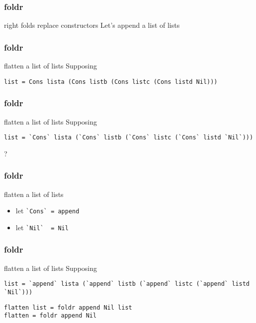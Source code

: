 %

\begin{frame}[fragile]
\frametitle{foldr}
\begin{block}{right folds replace constructors}
Let's append a list of lists
\end{block}
\end{frame}

\begin{frame}[fragile]
\frametitle{foldr}
\begin{block}{flatten a list of lists}
Supposing 
\begin{lstlisting}[style=haskell,basicstyle=\tiny\ttfamily,mathescape]
list = Cons lista (Cons listb (Cons listc (Cons listd Nil)))
\end{lstlisting}
\end{block}
\end{frame}

\begin{frame}[fragile]
\frametitle{foldr}
\begin{block}{flatten a list of lists}
Supposing 
\begin{lstlisting}[style=haskell,basicstyle=\tiny\ttfamily,mathescape]
list = `Cons` lista (`Cons` listb (`Cons` listc (`Cons` listd `Nil`)))
\end{lstlisting}
\end{block}
\begin{center}
\LARGE
?
\end{center}
\end{frame}

\begin{frame}[fragile]
\frametitle{foldr}
\begin{block}{flatten a list of lists}
\begin{itemize}
\item let \lstinline{`Cons` = append}
\item let \lstinline{`Nil`  = Nil}
\end{itemize}
\end{block}
\end{frame}

\begin{frame}[fragile]
\frametitle{foldr}
\begin{block}{flatten a list of lists}
Supposing
\begin{lstlisting}[style=haskell,basicstyle=\tiny\ttfamily,mathescape]
list = `append` lista (`append` listb (`append` listc (`append` listd `Nil`)))
\end{lstlisting}
\end{block}
\begin{lstlisting}[style=haskell,basicstyle=\scriptsize\ttfamily,mathescape]
flatten list = foldr append Nil list
flatten = foldr append Nil
\end{lstlisting}
\end{frame}

